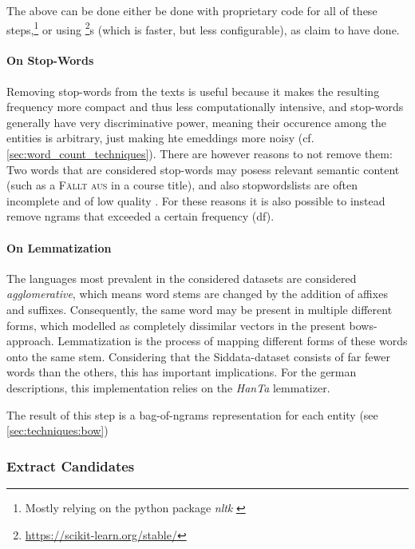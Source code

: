 The above can be done either be done with proprietary code for all of these steps,\footnote{Mostly relying on the python package \emph{nltk} \cite{bird2009natural}} or using \footnote{\url{https://scikit-learn.org/stable/}}s  (which is faster, but less configurable), as \cite{Ager2018} claim to have done.

\paragraph{On Stop-Words}
Removing stop-words from the texts is useful because it makes the resulting frequency more compact and thus less computationally intensive, and stop-words generally have very discriminative power, meaning their occurence among the entities is arbitrary, just making hte emeddings more noisy (cf. \autoref{sec:word_count_techniques}). There are however reasons to not remove them: Two words that are considered stop-words may posess relevant semantic content (such as a \textsc{Fällt aus} in a course title), and also stopwordslists are often incomplete and of low quality \cite{nothman-etal-2018-stop}. For these reasons it is also possible to instead remove \glspl{ngram} that exceeded a certain frequency (\gls{df}).

\paragraph{On Lemmatization}
The languages most prevalent in the considered datasets are considered \textit{agglomerative}, which means word stems are changed by the addition of affixes and suffixes. Consequently, the same word may be present in multiple different forms, which modelled as completely dissimilar vectors in the present \glspl{bow}-approach. Lemmatization is the process of mapping different forms of these words onto the same stem. Considering that the Siddata-dataset consists of far fewer words than the others, this has important implications. For the german descriptions, this implementation relies on the \textit{HanTa} lemmatizer.  %

The result of this step is a bag-of-ngrams representation for each entity (see \autoref{sec:techniques:bow})


\subsubsection{Extract Candidates}
\label{sec:extract_cands}

